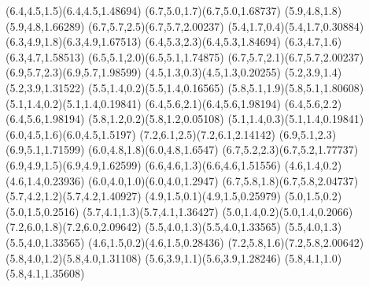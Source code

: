 \pstThreeDLine[linecolor=black](6.4,4.5,1.5)(6.4,4.5,1.48694)
\pstThreeDLine[linecolor=black](6.7,5.0,1.7)(6.7,5.0,1.68737)
\pstThreeDLine[linecolor=black](5.9,4.8,1.8)(5.9,4.8,1.66289)
\pstThreeDLine[linecolor=black](6.7,5.7,2.5)(6.7,5.7,2.00237)
\pstThreeDLine[linecolor=black](5.4,1.7,0.4)(5.4,1.7,0.30884)
\pstThreeDLine[linecolor=black](6.3,4.9,1.8)(6.3,4.9,1.67513)
\pstThreeDLine[linecolor=black](6.4,5.3,2.3)(6.4,5.3,1.84694)
\pstThreeDLine[linecolor=black](6.3,4.7,1.6)(6.3,4.7,1.58513)
\pstThreeDLine[linecolor=black](6.5,5.1,2.0)(6.5,5.1,1.74875)
\pstThreeDLine[linecolor=black](6.7,5.7,2.1)(6.7,5.7,2.00237)
\pstThreeDLine[linecolor=black](6.9,5.7,2.3)(6.9,5.7,1.98599)
\pstThreeDLine[linecolor=black](4.5,1.3,0.3)(4.5,1.3,0.20255)
\pstThreeDLine[linecolor=black](5.2,3.9,1.4)(5.2,3.9,1.31522)
\pstThreeDLine[linecolor=black](5.5,1.4,0.2)(5.5,1.4,0.16565)
\pstThreeDLine[linecolor=black](5.8,5.1,1.9)(5.8,5.1,1.80608)
\pstThreeDLine[linecolor=black](5.1,1.4,0.2)(5.1,1.4,0.19841)
\pstThreeDLine[linecolor=black](6.4,5.6,2.1)(6.4,5.6,1.98194)
\pstThreeDLine[linecolor=black](6.4,5.6,2.2)(6.4,5.6,1.98194)
\pstThreeDLine[linecolor=black](5.8,1.2,0.2)(5.8,1.2,0.05108)
\pstThreeDLine[linecolor=black](5.1,1.4,0.3)(5.1,1.4,0.19841)
\pstThreeDLine[linecolor=black](6.0,4.5,1.6)(6.0,4.5,1.5197)
\pstThreeDLine[linecolor=black](7.2,6.1,2.5)(7.2,6.1,2.14142)
\pstThreeDLine[linecolor=black](6.9,5.1,2.3)(6.9,5.1,1.71599)
\pstThreeDLine[linecolor=black](6.0,4.8,1.8)(6.0,4.8,1.6547)
\pstThreeDLine[linecolor=black](6.7,5.2,2.3)(6.7,5.2,1.77737)
\pstThreeDLine[linecolor=gray](6.9,4.9,1.5)(6.9,4.9,1.62599)
\pstThreeDLine[linecolor=gray](6.6,4.6,1.3)(6.6,4.6,1.51556)
\pstThreeDLine[linecolor=gray](4.6,1.4,0.2)(4.6,1.4,0.23936)
\pstThreeDLine[linecolor=gray](6.0,4.0,1.0)(6.0,4.0,1.2947)
\pstThreeDLine[linecolor=gray](6.7,5.8,1.8)(6.7,5.8,2.04737)
\pstThreeDLine[linecolor=gray](5.7,4.2,1.2)(5.7,4.2,1.40927)
\pstThreeDLine[linecolor=gray](4.9,1.5,0.1)(4.9,1.5,0.25979)
\pstThreeDLine[linecolor=gray](5.0,1.5,0.2)(5.0,1.5,0.2516)
\pstThreeDLine[linecolor=gray](5.7,4.1,1.3)(5.7,4.1,1.36427)
\pstThreeDLine[linecolor=gray](5.0,1.4,0.2)(5.0,1.4,0.2066)
\pstThreeDLine[linecolor=gray](7.2,6.0,1.8)(7.2,6.0,2.09642)
\pstThreeDLine[linecolor=gray](5.5,4.0,1.3)(5.5,4.0,1.33565)
\pstThreeDLine[linecolor=gray](5.5,4.0,1.3)(5.5,4.0,1.33565)
\pstThreeDLine[linecolor=gray](4.6,1.5,0.2)(4.6,1.5,0.28436)
\pstThreeDLine[linecolor=gray](7.2,5.8,1.6)(7.2,5.8,2.00642)
\pstThreeDLine[linecolor=gray](5.8,4.0,1.2)(5.8,4.0,1.31108)
\pstThreeDLine[linecolor=gray](5.6,3.9,1.1)(5.6,3.9,1.28246)
\pstThreeDLine[linecolor=gray](5.8,4.1,1.0)(5.8,4.1,1.35608)
